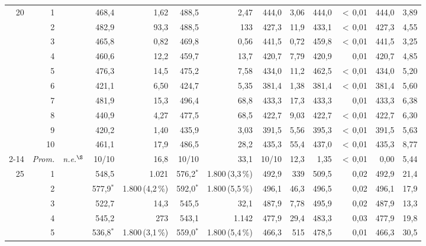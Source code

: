 \documentclass[11pt,a4paper]{article}
\begin{document}
\begin{table}[htbp]
{\begin{tabular}{rr rr rr rr rr rr rr}
\midrule
20 & 1 &  &  & 468{,}4 & 1{,}62 & 488{,}5 & 2{,}47 & 444{,}0 & 3{,}06 & 444{,}0 & $<$\,0{,}01 & 444{,}0 & 3{,}89 \\
 & 2 &  &  & 482{,}9 & 93{,}3 & 488{,}5 & 133 & 427{,}3 & 11{,}9 & 433{,}1 & $<$\,0{,}01 & 427{,}3 & 4{,}55 \\
 & 3 &  &  & 465{,}8 & 0{,}82 & 469{,}8 & 0{,}56 & 441{,}5 & 0{,}72 & 459{,}8 & $<$\,0{,}01 & 441{,}5 & 3{,}25 \\
 & 4 &  &  & 460{,}6 & 12{,}2 & 459{,}7 & 13{,}7 & 420{,}7 & 7{,}79 & 420{,}9 & 0{,}01 & 420{,}7 & 4{,}85 \\
 & 5 &  &  & 476{,}3 & 14{,}5 & 475{,}2 & 7{,}58 & 434{,}0 & 11{,}2 & 462{,}5 & $<$\,0{,}01 & 434{,}0 & 5{,}20 \\
 & 6 &  &  & 421{,}1 & 6{,}50 & 424{,}7 & 5{,}35 & 381{,}4 & 1{,}38 & 381{,}4 & $<$\,0{,}01 & 381{,}4 & 5{,}60 \\
 & 7 &  &  & 481{,}9 & 15{,}3 & 496{,}4 & 68{,}8 & 433{,}3 & 17{,}3 & 433{,}3 & 0{,}01 & 433{,}3 & 6{,}38 \\
 & 8 &  &  & 440{,}9 & 4{,}27 & 477{,}5 & 68{,}5 & 422{,}7 & 9{,}03 & 422{,}7 & $<$\,0{,}01 & 422{,}7 & 6{,}30 \\
 & 9 &  &  & 420{,}2 & 1{,}40 & 435{,}9 & 3{,}03 & 391{,}5 & 5{,}56 & 395{,}3 & $<$\,0{,}01 & 391{,}5 & 5{,}63 \\
 & 10 &  &  & 461{,}1 & 17{,}9 & 486{,}5 & 28{,}2 & 435{,}3 & 55{,}4 & 437{,}0 & $<$\,0{,}01 & 435{,}3 & 8{,}77 \\
\cmidrule(l){2-14}
 & \emph{Prom.} & \multicolumn{2}{c}{\textit{n.e.}$^{\S}$} & 10/10 & 16{,}8 & 10/10 & 33{,}1 & 10/10 & 12{,}3 & 1{,}35 & $<$\,0{,}01 & 0{,}00 & 5{,}44 \\
\midrule
25 & 1 &  &  & 548{,}5 & 1.021 & 576{,}2$^{*}$ & 1.800\,{\scriptsize(3{,}3\,\%)} & 492{,}9 & 339 & 509{,}5 & 0{,}02 & 492{,}9 & 21{,}4 \\
 & 2 &  &  & 577{,}9$^{*}$ & 1.800\,{\scriptsize(4{,}2\,\%)} & 592{,}0$^{*}$ & 1.800\,{\scriptsize(5{,}5\,\%)} & 496{,}1 & 46{,}3 & 496{,}5 & 0{,}02 & 496{,}1 & 17{,}9 \\
 & 3 &  &  & 522{,}7 & 14{,}3 & 545{,}5 & 32{,}1 & 487{,}9 & 7{,}78 & 495{,}9 & 0{,}02 & 487{,}9 & 13{,}3 \\
 & 4 &  &  & 545{,}2 & 273 & 543{,}1 & 1.142 & 477{,}9 & 29{,}4 & 483{,}3 & 0{,}03 & 477{,}9 & 19{,}8 \\
 & 5 &  &  & 536{,}8$^{*}$ & 1.800\,{\scriptsize(3{,}1\,\%)} & 559{,}0$^{*}$ & 1.800\,{\scriptsize(5{,}4\,\%)} & 466{,}3 & 515 & 478{,}5 & 0{,}01 & 466{,}3 & 30{,}5 \\

\end{tabular}}
\end{table}
\end{document}

